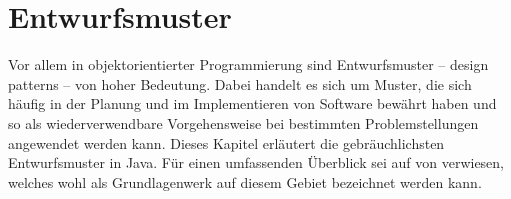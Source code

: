 \section{Entwurfsmuster}\label{designPattern}

Vor allem in objektorientierter Programmierung sind Entwurfsmuster -- \engl design patterns -- von hoher Bedeutung. Dabei handelt es sich um Muster, die sich häufig in der Planung und im Implementieren von Software bewährt haben und so als wiederverwendbare Vorgehensweise bei bestimmten Problemstellungen angewendet werden kann. Dieses Kapitel erläutert die gebräuchlichsten Entwurfsmuster in Java. Für einen umfassenden Überblick sei auf  von \citeauthor{gamma_design_1995} verwiesen, welches wohl als Grundlagenwerk auf diesem Gebiet bezeichnet werden kann.




